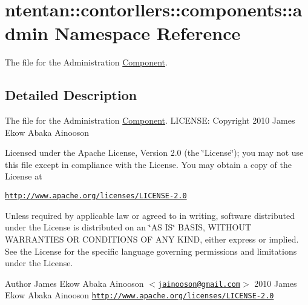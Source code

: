 \hypertarget{namespacententan_1_1contorllers_1_1components_1_1admin}{
\section{ntentan::contorllers::components::admin Namespace Reference}
\label{namespacententan_1_1contorllers_1_1components_1_1admin}
}


The file for the Administration \hyperlink{class_component}{Component}.  




\subsection{Detailed Description}
The file for the Administration \hyperlink{class_component}{Component}. LICENSE: Copyright 2010 James Ekow Abaka Ainooson

Licensed under the Apache License, Version 2.0 (the \char`\"{}License\char`\"{}); you may not use this file except in compliance with the License. You may obtain a copy of the License at

\href{http://www.apache.org/licenses/LICENSE-2.0}{\tt http://www.apache.org/licenses/LICENSE-\/2.0}

Unless required by applicable law or agreed to in writing, software distributed under the License is distributed on an \char`\"{}AS IS\char`\"{} BASIS, WITHOUT WARRANTIES OR CONDITIONS OF ANY KIND, either express or implied. See the License for the specific language governing permissions and limitations under the License.

\begin{DoxyAuthor}{Author}
James Ekow Abaka Ainooson $<$\href{mailto:jainooson@gmail.com}{\tt jainooson@gmail.com}$>$  2010 James Ekow Abaka Ainooson  \href{http://www.apache.org/licenses/LICENSE-2.0}{\tt http://www.apache.org/licenses/LICENSE-\/2.0} 
\end{DoxyAuthor}
